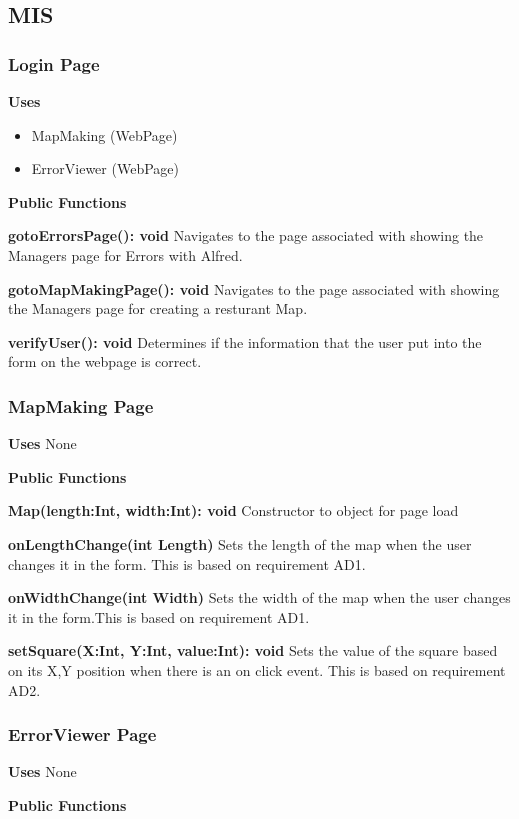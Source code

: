 \documentclass [10pt]{article}
\begin{document}
\subsection{MIS}

\subsubsection{Login Page}
\textbf{Uses}
\begin{itemize}
	\item MapMaking (WebPage)
	\item ErrorViewer (WebPage)
\end{itemize}



\textbf{Public Functions}

\textbf{gotoErrorsPage(): void}
Navigates to the page associated with showing the Managers page for Errors with Alfred.

\textbf{gotoMapMakingPage(): void}
Navigates to the page associated with showing the Managers page for creating a resturant Map.

\textbf{verifyUser(): void}
Determines if the information that the user put into the form on the webpage is correct.


\subsubsection{MapMaking Page}
\textbf{Uses}
None

\textbf{Public Functions}

\textbf{ Map(length:Int, width:Int): void}
Constructor to object for page load

\textbf{onLengthChange(int Length)}
Sets the length of the map when the user changes it in the form. This is based on requirement AD1.

\textbf{onWidthChange(int Width)}
Sets the width of the map when the user changes it in the form.This is based on requirement AD1.

\textbf{setSquare(X:Int, Y:Int, value:Int): void}
Sets the value of the square based on its X,Y position when there is an on click event. This is based on requirement AD2.

\subsubsection{ErrorViewer Page}
\textbf{Uses}
None

\textbf{Public Functions}
\end{document}
